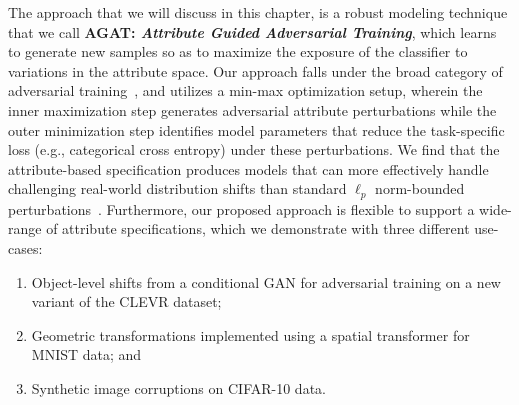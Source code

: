The approach that we will discuss in this chapter, is a robust modeling technique that we call \textbf{AGAT: \textit{Attribute Guided Adversarial Training}}, which learns to generate new samples so as to maximize the exposure of the classifier to variations in the attribute space.
Our approach falls under the broad category of adversarial training~\citep{madry2017towards}, and utilizes a min-max optimization setup, wherein the inner maximization step generates adversarial attribute perturbations while the outer minimization step identifies model parameters that reduce the task-specific loss (e.g., categorical cross entropy) under these perturbations.
We find that the attribute-based specification produces models that can more effectively handle challenging real-world distribution shifts than standard $\ell_p$ norm-bounded perturbations~\citep{qiao2020learning}.
Furthermore, our proposed approach is flexible to support a wide-range of attribute specifications, which we demonstrate with three different use-cases:
\begin{enumerate}[nosep,noitemsep,leftmargin=2em]
    \item Object-level shifts from a conditional GAN for adversarial training on a new variant of the CLEVR dataset;
    \item Geometric transformations implemented using a spatial transformer for MNIST data; and
    \item Synthetic image corruptions on CIFAR-10 data.
\end{enumerate}


